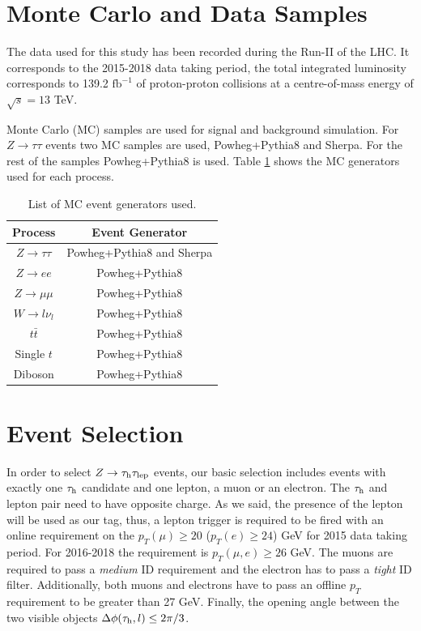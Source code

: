 \section{Monte Carlo and Data Samples}
The data used for this study has been recorded during the Run-II of the LHC. It corresponds to the 2015-2018 data taking period, the total integrated luminosity corresponds to 139.2 $\text{fb}^{-1}$ of proton-proton collisions at a centre-of-mass energy of $\sqrt{s}=13$ TeV.

Monte Carlo (MC) samples are used for signal and background simulation. For $Z\to\tau\tau$ events two MC samples are used, Powheg+Pythia8 and Sherpa. For the rest of the samples Powheg+Pythia8 is used. Table \ref{Table3} shows the MC generators used for each process.

\begin{table}[]
	\centering
	\begin{tabular}{cc}
		\hline
		\multicolumn{1}{|c|}{Process}  & \multicolumn{1}{c|}{Event Generator} \\ \hline
		$Z\to\tau\tau$                 & Powheg+Pythia8 and Sherpa            \\
		$Z\to ee$                      & Powheg+Pythia8                       \\
		$Z\to\mu\mu$                   & Powheg+Pythia8                       \\
		$W\to l\nu_l$				   & Powheg+Pythia8                       \\
		$t\bar{t}$                     & Powheg+Pythia8                       \\
		Single $t$                     & Powheg+Pythia8                       \\
		Diboson                        & Powheg+Pythia8                       \\ \hline
	\end{tabular}
	\caption{List of MC event generators used.}
	\label{Table3}
\end{table}
\section{Event Selection}\label{chap4sec3}
In order to select $Z\to\tau_\text{h}\tau_\text{lep}$ events, our basic selection includes events with exactly one $\tau_\text{h}$ candidate and one lepton, a muon or an electron. The $\tau_\text{h}$ and lepton pair need to have opposite charge. As we said, the presence of the lepton will be used as our tag, thus, a lepton trigger is required to be fired with an online requirement on the $p_{T}(\mu)\geq 20$ ($p_{T}(e)\geq 24$) GeV for 2015 data taking period. For 2016-2018 the requirement is $p_{T}(\mu,e)\geq 26$ GeV. The muons are required to pass a \textit{medium} ID requirement and the electron has to pass a \textit{tight} ID filter. Additionally, both muons and electrons have to pass an offline $p_T$ requirement to be greater than 27 GeV. Finally, the opening angle between the two visible objects $\Delta\phi(\tau_\text{h},l)\leq 2\pi/3$.


